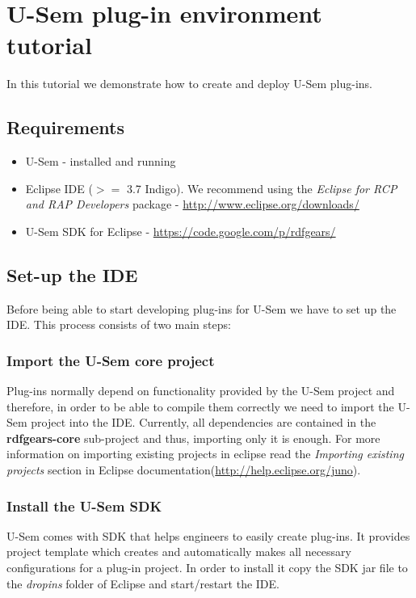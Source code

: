 \chapter{U-Sem plug-in environment tutorial} 
\label{cha:tutorial}

In this tutorial we demonstrate how to create and deploy U-Sem plug-ins. 

\section{Requirements}

\begin{itemize}
	\item U-Sem - installed and running
	\item Eclipse IDE ($>=$ 3.7 Indigo). We recommend using the \textit{Eclipse for RCP and RAP Developers} package - \url{http://www.eclipse.org/downloads/}
	\item U-Sem SDK for Eclipse - \url{https://code.google.com/p/rdfgears/}
\end{itemize}

\section{Set-up the IDE}

Before being able to start developing plug-ins for U-Sem we have to set up the IDE. This process consists of two main steps:

\subsection{Import the U-Sem core project}

Plug-ins normally depend on functionality provided by the U-Sem project and therefore, in order to be able to compile them correctly we need to import the U-Sem project into the IDE. Currently, all dependencies are contained in the \textbf{rdfgears-core} sub-project and thus, importing only it is enough. For more information on importing existing projects in eclipse read the \textit{Importing existing projects} section in Eclipse documentation(\url{http://help.eclipse.org/juno}).

\subsection{Install the U-Sem SDK}
U-Sem comes with SDK that helps engineers to easily create plug-ins. It provides project template which creates and automatically makes all necessary configurations for a plug-in project. In order to install it copy the SDK jar file to the \textit{dropins} folder of Eclipse and start/restart the IDE. 

